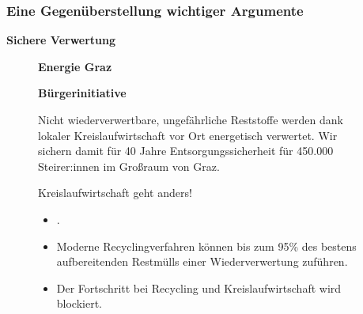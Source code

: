 \documentclass[8pt]{beamer}
\begin{document}
	
	\begin{frame}[t]
		\frametitle{Eine Gegenüberstellung wichtiger Argumente} 
		\textbf{Sichere Verwertung}
		\begin{figure}[htbp]
			\begin{minipage}[t]{0.38\textwidth}
				\textbf{Energie Graz}
			\end{minipage}
			\hfill
			\begin{minipage}[t]{0.58\textwidth}
				\textbf{Bürgerinitiative}
			\end{minipage}
		\end{figure}
		\begin{figure}[htbp]
			\begin{minipage}[t]{0.38\textwidth}
				\begin{framed}
				Nicht wiederverwertbare, ungefährliche Reststoffe werden dank lokaler Kreislaufwirtschaft vor Ort energetisch verwertet. Wir sichern damit für 40 Jahre Entsorgungssicherheit für 450.000 Steirer:innen im Großraum von Graz.
			\end{framed}			
			\end{minipage}
			\hfill
			\begin{minipage}[t]{0.58\textwidth}
				\begin{framed}
					Kreislaufwirtschaft geht anders!
					\begin{itemize}
						\item {}. 
						\item Moderne Recyclingverfahren können bis zum 95\% des bestens aufbereitenden Restmülls einer Wiederverwertung zuführen.
						\item Der Fortschritt bei Recycling und Kreislaufwirtschaft wird blockiert.
					\end{itemize}
				\end{framed}
			\end{minipage}
		\end{figure}		
	\end{frame}		
	
\end{document}
